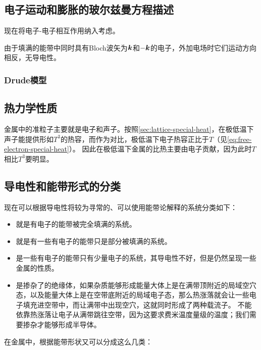\subsection{电子运动和膨胀的玻尔兹曼方程描述}

现在将电子-电子相互作用纳入考虑。

由于填满的能带中同时具有Bloch波矢为$\vb*{k}$和$-\vb*{k}$的电子，外加电场时它们运动方向相反，无导电性。

\subsubsection{Drude模型}

\subsection{热力学性质}


金属中的准粒子主要就是电子和声子。按照\autoref{sec:lattice-special-heat}，在极低温下声子能提供形如$T^3$的热容，而作为对比，极低温下电子热容正比于$T$（见\eqref{eq:free-electron-special-heat}）。
因此在极低温下金属的比热主要由电子贡献，因为此时$T$相比$T^3$要明显。

\subsection{导电性和能带形式的分类}\label{sec:conductor-classification}

现在可以根据导电性将较为寻常的、可以使用能带论解释的系统分类如下：
\begin{itemize}
    \item {}就是有电子的能带被完全填满的系统。
    \item {}就是有一些有电子的能带只是部分被填满的系统。
    \item {}是一些有电子的能带只有少量电子的系统，其导电性不好，但是仍然呈现一些金属的性质。
    \item {}是掺杂了的绝缘体，如果杂质能够形成能量大体上是在满带顶附近的局域空穴态，以及能量大体上是在空带底附近的局域电子态，那么热涨落就会让一些电子填充进空带中，而让满带中出现空穴，这就同时形成了两种载流子。
    不能依靠热涨落让电子从满带跳往空带，因为这要求费米温度量级的温度；我们需要掺杂才能够形成半导体。
\end{itemize}

在金属中，根据能带形状又可以分成这么几类：

